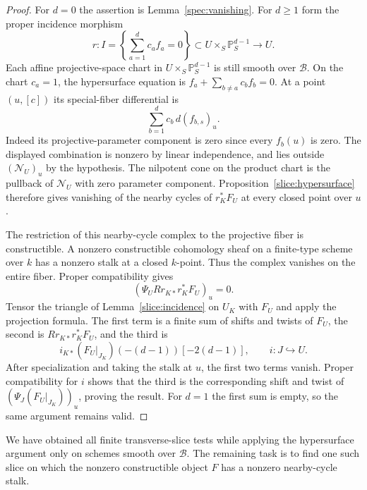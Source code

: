 \begin{proof}
For $d=0$ the assertion is Lemma~\ref{spec:vanishing}.
For $d\geq1$ form the proper incidence morphism
\[
 r:I=\left\{\sum_{a=1}^d c_af_a=0\right\}
       \subset U\times_S\mathbb P_S^{d-1}\longrightarrow U.
\]
Each affine projective-space chart in
$U\times_S\mathbb P_S^{d-1}$ is still smooth over $\mathcal B$.
On the chart $c_a=1$, the hypersurface equation is
$f_a+\sum_{b\ne a}c_bf_b=0$.  At a point $(u,[c])$ its
special-fiber differential is
\[
                          \sum_{b=1}^d c_b\,d(f_{b,s})_u.
\]
Indeed its projective-parameter component is zero since every
$f_b(u)$ is zero.  The displayed combination is nonzero by linear
independence, and lies outside $(\mathcal N_U)_u$ by the hypothesis.
The nilpotent cone on the product chart is the pullback of
$\mathcal N_U$ with zero parameter component.  Proposition~\ref{slice:hypersurface}
therefore gives vanishing of the nearby cycles of $r_K^*F_U$ at
every closed point over $u$.

The restriction of this nearby-cycle complex to the projective fiber
is constructible.  A nonzero constructible cohomology sheaf on a
finite-type scheme over $k$ has a nonzero stalk at a closed
$k$-point.  Thus the complex vanishes on the entire fiber.  Proper
compatibility gives
\[
                      (\Psi_U Rr_{K*}r_K^*F_U)_u=0.
\]
Tensor the triangle of Lemma~\ref{slice:incidence} on $U_K$ with
$F_U$ and apply the projection formula.  The first term is a finite
sum of shifts and twists of $F_U$, the second is
$Rr_{K*}r_K^*F_U$, and the third is
\[
                    i_{K*}(F_U|_{J_K})(-(d-1))[-2(d-1)],
                    \qquad i:J\hookrightarrow U.
\]
After specialization and taking the stalk at $u$, the first two
terms vanish.  Proper compatibility for $i$ shows that the third
is the corresponding shift and twist of
$(\Psi_J(F_U|_{J_K}))_u$, proving the result.  For $d=1$ the first
sum is empty, so the same argument remains valid.
\end{proof}

We have obtained all finite transverse-slice tests while applying the
hypersurface argument only on schemes smooth over $\mathcal B$.
The remaining task is to find one such slice on which the nonzero
constructible object $F$ has a nonzero nearby-cycle stalk.
